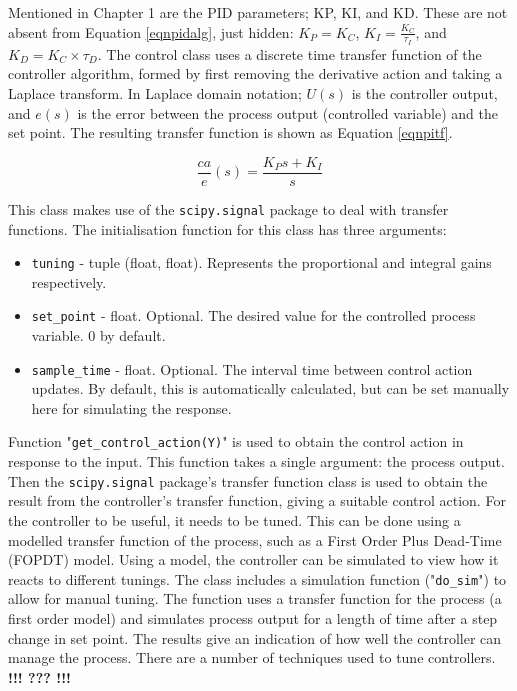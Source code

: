 \documentclass[twoside,a4]{report}
\def\br{\newline \newline \noindent}
\def\cbh{\large\bfseries !!! ??? !!! \normalsize\normalfont}
\begin{document}
	\noindent
	Mentioned in Chapter 1 are the PID parameters; KP, KI, and KD. These are not absent from Equation \ref{eqnpidalg}, just hidden: \(K_P = K_C\), \(K_I = \frac{K_C}{\tau _I}\), and \(K_D = K_C \times \tau_D\).\br
	The control class uses a discrete time transfer function of the controller algorithm, formed by first removing the derivative action and taking a Laplace transform. In Laplace domain notation; $U(s)$ is the controller output, and $e(s)$ is the error between the process output (controlled variable) and the set point. The resulting transfer function is shown as Equation \ref{eqnpitf}.
	
	\begin{equation}
		\frac{ca}{e}(s) = \frac{K_P  s + K_I}{s}
		\label{eqnpitf}
	\end{equation}
	
	\noindent
	This class makes use of the \texttt{scipy.signal} package to deal with transfer functions.\br
	The initialisation function for this class has three arguments:
	\begin{itemize}
		\item \texttt{tuning} - tuple (float, float). Represents the proportional and integral gains respectively.
		\item \texttt{set\_point} - float. Optional. The desired value for the controlled process variable. 0 by default.
		\item \texttt{sample\_time} - float. Optional. The interval time between control action updates. By default, this is automatically calculated, but can be set manually here for simulating the response.
	\end{itemize}
	Function "\texttt{get\_control\_action(Y)}" is used to obtain the control action in response to the input. This function takes a single argument: the process output. Then the \texttt{scipy.signal} package's transfer function class is used to obtain the result from the controller's transfer function, giving a suitable control action.
	For the controller to be useful, it needs to be tuned. This can be done using a modelled transfer function of the process, such as a First Order Plus Dead-Time (FOPDT) model. Using a model, the controller can be simulated to view how it reacts to different tunings. The class includes a simulation function ("\texttt{do\_sim}") to allow for manual tuning. The function uses a transfer function for the process (a first order model) and simulates process output for a length of time after a step change in set point. The results give an indication of how well the controller can manage the process. \br
	There are a number of techniques used to tune controllers.
	\cbh
\end{document}
